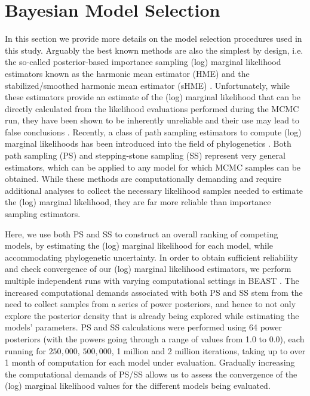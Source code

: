 \documentclass[a4paper,10pt]{article}
\begin{document}
\section*{Bayesian Model Selection}

In this section we provide more details on the model selection procedures used in this study.
Arguably the best known methods are also the simplest by design, i.e. the so-called posterior-based importance sampling (log) marginal likelihood estimators known as the harmonic mean estimator (HME) \cite{Newton} and the stabilized/smoothed harmonic mean estimator (sHME) \cite{M-suchard2005models}.
Unfortunately, while these estimators provide an estimate of the (log) marginal likelihood that can be directly calculated from the likelihood evaluations performed during the MCMC run, they have been shown to be inherently unreliable and their use may lead to false conclusions \cite{M-LartillotPhilippe, M-Xie, M-Baele2012, M-Baele2013a, M-Baele2013b, M-Baele2013c}.
Recently, a class of path sampling estimators to compute (log) marginal likelihoods has been introduced into the field of phylogenetics \cite{M-LartillotPhilippe, M-Xie}.
Both path sampling (PS) and stepping-stone sampling (SS) represent very general estimators, which can be applied to any model for which MCMC samples can be obtained.
While these methods are computationally demanding and require additional analyses to collect the necessary likelihood samples needed to estimate the (log) marginal likelihood, they are far more reliable than importance sampling estimators.

Here, we use both PS and SS to construct an overall ranking of competing models, by estimating the (log) marginal likelihood for each model, while accommodating phylogenetic uncertainty.
In order to obtain sufficient reliability and check convergence of our (log) marginal likelihood estimators, we perform multiple independent runs with varying computational settings in BEAST \cite{M-beast2012}.
The increased computational demands associated with both PS and SS stem from the need to collect samples from a series of power posteriors, and hence to not only explore the posterior density that is already being explored while estimating the models' parameters.
PS and SS calculations were performed using 64 power posteriors (with the powers going through a range of values from 1.0 to 0.0), each running for $250,000$, $500,000$, 1 million and 2 million iterations, taking up to over 1 month of computation for each model under evaluation.
Gradually increasing the computational demands of PS/SS allows us to assess the convergence of the (log) marginal likelihood values for the different models being evaluated.
\end{document}
